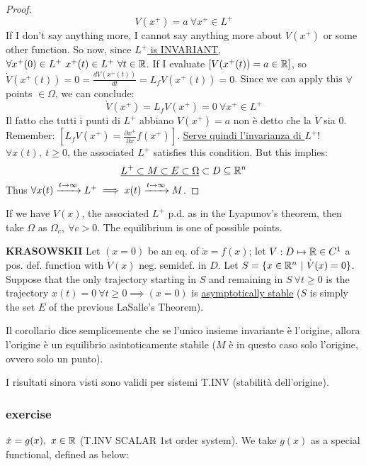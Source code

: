 \begin{proof}
\[
	V(x^+) = a\ \forall x^+ \in L^+
\]
If I don't say anything more, I cannot say anything more about $V(x^+)$ or some other function.
So now, since \underline{$L^+$ is INVARIANT}, $\forall x^+(0) \in L^+\ x^+(t) \in L^+\ \forall t \in \R$.
If I evaluate $[V(x^+(t)) = a \in \mathbb{R}]$, so $\dot{V}(x^+(t)) = 0 = \frac{dV(x^+(t))}{dt} = L_fV(x^+(t)) = 0$. 
Since we can apply this $\forall$ points $\in \Omega$, we can conclude:
\[
	\dot{V}(x^+) = L_fV(x^+) = 0\ \forall x^+ \in L^+
\]
Il fatto che tutti i punti di $L^+$ abbiano $V(x^+) = a$ non è detto che la $\dot{V}$ sia 0. Remember: $[L_fV(x^+) = \frac{\partial{x^+}}{\partial{x}}f(x^+)]$. \underline{Serve quindi l'invarianza di $L^+$}!
$\forall x(t),\ t \geq 0$, the associated $L^+$ satisfies this condition. But this implies:
\[
	\underline{L^+ \subset M \subset E \subset \Omega} \subset D \subseteq \mathbb{R}^n
\]
Thus $\forall x(t) \tendsto{t\to\infty} L^+ \implies x(t) \tendsto{t\to\infty} M$. 
\end{proof}

If we have $V(x)$, the associated $L^+$ p.d. as in the Lyapunov's theorem, then take $\Omega$ as $\Omega_c,\ \forall c > 0$. The equilibrium is one of possible points.

\begin{corl}{\textbf{KRASOWSKII}} \newline
Let $(x=0)$ be an eq. of $\dot{x}=f(x)$; let $V:D\mapsto \mathbb{R} \in C^1$ a pos. def. function with $\dot{V}(x)$ neg. semidef. in $D$. Let $S = \{x \in \mathbb{R}^n\ |\ \dot{V}(x) = 0\}$. Suppose that the only trajectory starting in $S$ and remaining in $S\ \forall t \geq 0$ is the trajectory $x(t) = 0\ \forall t \geq 0 \implies (x=0)$ is \underline{asymptotically stable} ($S$ is simply the set $E$ of the previous LaSalle's Theorem).
\end{corl}

Il corollario dice semplicemente che se l'unico insieme invariante è l'origine, allora l'origine è un equilibrio asintoticamente stabile ($M$ è in questo caso solo l'origine, ovvero solo un punto).

I risultati sinora visti sono validi per sistemi T.INV (stabilità dell'origine).

\subsubsection{exercise}

$\dot{x}=g(x),\ x \in \mathbb{R}$ (T.INV SCALAR 1st order system). We take $g(x)$ as a special functional, defined as below:

